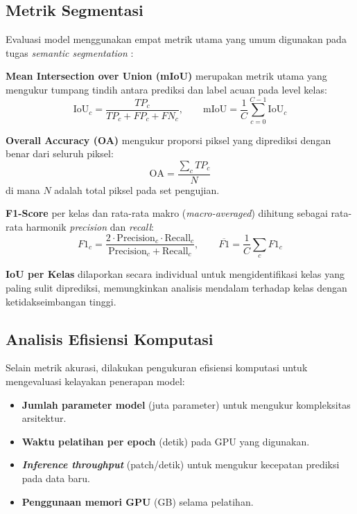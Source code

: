 \subsection{Metrik Segmentasi}

Evaluasi model menggunakan empat metrik utama yang umum digunakan pada tugas \textit{semantic segmentation} \citep{thomasramos2024}:

\textbf{Mean Intersection over Union (mIoU)} merupakan metrik utama yang mengukur tumpang tindih antara prediksi dan label acuan pada level kelas:
\begin{equation}
    \text{IoU}_c = \frac{TP_c}{TP_c + FP_c + FN_c}, \qquad
    \text{mIoU} = \frac{1}{C} \sum_{c=0}^{C-1} \text{IoU}_c
\end{equation}

\textbf{Overall Accuracy (OA)} mengukur proporsi piksel yang diprediksi dengan benar dari seluruh piksel:
\begin{equation}
    \text{OA} = \frac{\sum_{c} TP_c}{N}
\end{equation}
di mana $N$ adalah total piksel pada set pengujian.

\textbf{F1-Score} per kelas dan rata-rata makro (\textit{macro-averaged}) dihitung sebagai rata-rata harmonik \textit{precision} dan \textit{recall}:
\begin{equation}
    F1_c = \frac{2 \cdot \text{Precision}_c \cdot \text{Recall}_c}{\text{Precision}_c + \text{Recall}_c}, \qquad
    \overline{F1} = \frac{1}{C} \sum_{c} F1_c
\end{equation}

\textbf{IoU per Kelas} dilaporkan secara individual untuk mengidentifikasi kelas yang paling sulit diprediksi, memungkinkan analisis mendalam terhadap kelas dengan ketidakseimbangan tinggi.

\subsection{Analisis Efisiensi Komputasi}

Selain metrik akurasi, dilakukan pengukuran efisiensi komputasi untuk mengevaluasi kelayakan penerapan model:
\begin{itemize}
    \item \textbf{Jumlah parameter model} (juta parameter) untuk mengukur kompleksitas arsitektur.
    \item \textbf{Waktu pelatihan per epoch} (detik) pada GPU yang digunakan.
    \item \textbf{\textit{Inference throughput}} (patch/detik) untuk mengukur kecepatan prediksi pada data baru.
    \item \textbf{Penggunaan memori GPU} (GB) selama pelatihan.
\end{itemize}

